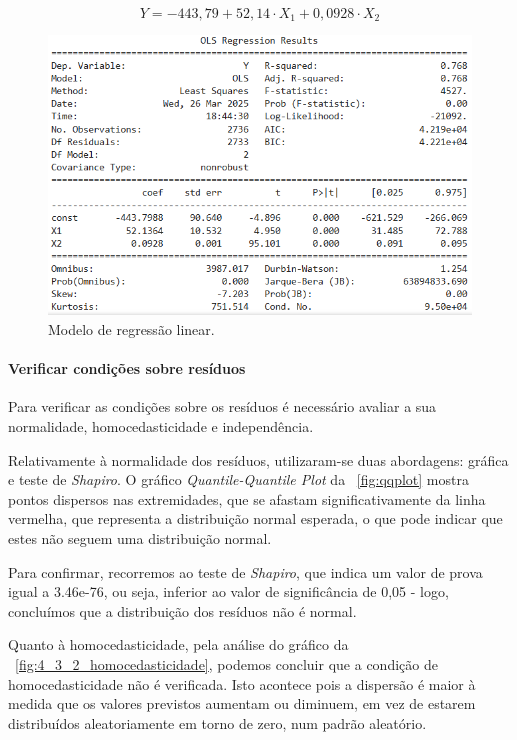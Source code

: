 \documentclass[conference]{IEEEtran}
\begin{document}
\begin{equation}
	Y = -443,79 + 52,14 \cdot X_1 + 0,0928 \cdot X_2 
	\label{eq:modelo}
\end{equation}



\begin{figure}
	\centering
	\includegraphics[width=0.9\linewidth]{OLS_4_3_2}
	\caption{Modelo de regressão linear.}
	\label{fig:ols}
\end{figure}

\medskip
\paragraph{\textbf{Verificar condições sobre resíduos}}\label{4_3_2_b_ref}

Para verificar as condições sobre os resíduos é necessário avaliar a sua normalidade, homocedasticidade e independência.

Relativamente à normalidade dos resíduos, utilizaram-se duas abordagens: gráfica e teste de \textit{Shapiro}. O gráfico \textit{Quantile-Quantile Plot} da \figurename~\ref{fig:qqplot} mostra pontos dispersos nas extremidades, que se afastam significativamente da linha vermelha, que representa a distribuição normal esperada, o que pode indicar que estes não seguem uma distribuição normal.

Para confirmar, recorremos ao teste de \textit{Shapiro}, que indica um valor de prova igual a 3.46e-76, ou seja, inferior ao valor de significância de 0,05 - logo, concluímos que a distribuição dos resíduos não é normal.

Quanto à homocedasticidade, pela análise do gráfico da \figurename~\ref{fig:4_3_2_homocedasticidade}, podemos concluir que a condição de homocedasticidade não é verificada. Isto acontece pois a dispersão é maior à medida que os valores previstos aumentam ou diminuem, em vez de estarem distribuídos aleatoriamente em torno de zero, num padrão aleatório.
\end{document}
